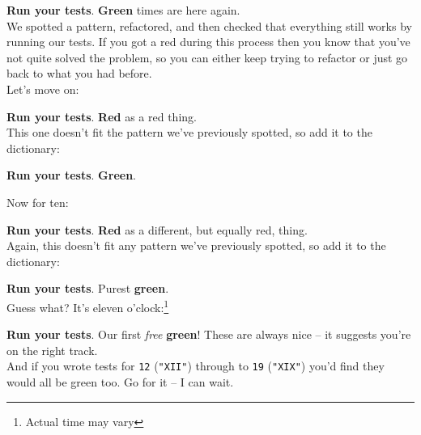 

\textbf{Run your tests}. \textbf{Green} times are here again.
\\

We spotted a pattern, refactored, and then checked that everything still works by running our tests. If you got a red during this process then you know that you've not quite solved the problem, so you can either keep trying to refactor or just go back to what you had before.
\\

Let's move on:



\textbf{Run your tests}. \textbf{Red} as a red thing.
\\

This one doesn't fit the pattern we've previously spotted, so add it to the dictionary:



\textbf{Run your tests}. \textbf{Green}.

\pagebreak

Now for ten:



\textbf{Run your tests}. \textbf{Red} as\textellipsis{} a different, but equally red, thing.
\\

Again, this doesn't fit any pattern we've previously spotted, so add it to the dictionary:


\textbf{Run your tests}. Purest \textbf{green}.
\\

Guess what? It's eleven o'clock:\footnote{Actual time may vary}


\textbf{Run your tests}. Our first \textit{free} \textbf{green}! These are always nice – it suggests you're on the right track.
\\

And if you wrote tests for \texttt{12} (\texttt{"XII"}) through to \texttt{19} (\texttt{"XIX"}) you'd find they would all be green too. Go for it – I can wait.

\pagebreak

